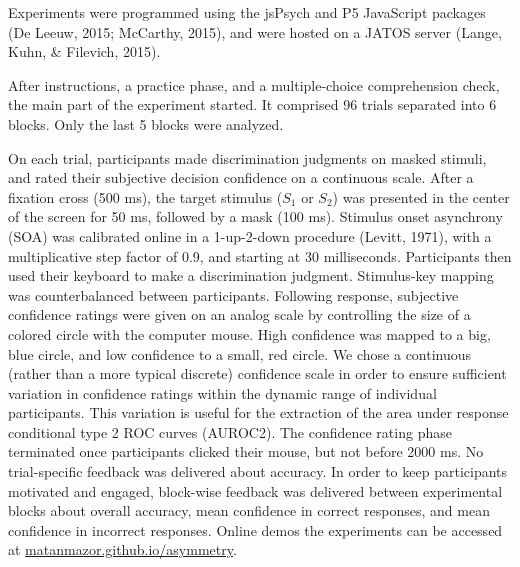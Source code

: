 \documentclass[12pt,twoside]{reedthesis}
\begin{document}
Experiments were programmed using the jsPsych and P5 JavaScript packages (De Leeuw, 2015; McCarthy, 2015), and were hosted on a JATOS server (Lange, Kuhn, \& Filevich, 2015).

After instructions, a practice phase, and a multiple-choice comprehension check, the main part of the experiment started. It comprised 96 trials separated into 6 blocks. Only the last 5 blocks were analyzed.

On each trial, participants made discrimination judgments on masked stimuli, and rated their subjective decision confidence on a continuous scale. After a fixation cross (500 ms), the target stimulus (\(S_1\) or \(S_2\)) was presented in the center of the screen for 50 ms, followed by a mask (100 ms). Stimulus onset asynchrony (SOA) was calibrated online in a 1-up-2-down procedure (Levitt, 1971), with a multiplicative step factor of 0.9, and starting at 30 milliseconds. Participants then used their keyboard to make a discrimination judgment. Stimulus-key mapping was counterbalanced between participants. Following response, subjective confidence ratings were given on an analog scale by controlling the size of a colored circle with the computer mouse. High confidence was mapped to a big, blue circle, and low confidence to a small, red circle. We chose a continuous (rather than a more typical discrete) confidence scale in order to ensure sufficient variation in confidence ratings within the dynamic range of individual participants. This variation is useful for the extraction of the area under response conditional type 2 ROC curves (AUROC2). The confidence rating phase terminated once participants clicked their mouse, but not before 2000 ms. No trial-specific feedback was delivered about accuracy. In order to keep participants motivated and engaged, block-wise feedback was delivered between experimental blocks about overall accuracy, mean confidence in correct responses, and mean confidence in incorrect responses. Online demos the experiments can be accessed at \url{matanmazor.github.io/asymmetry}.
\end{document}
